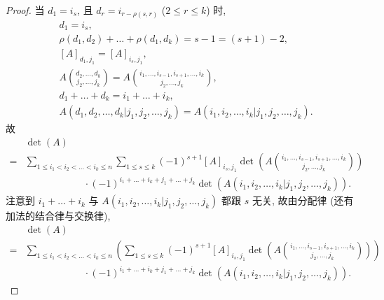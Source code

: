 \begin{proof}
    当 \(d_1 = i_s\),
    且 \(d_r = i_{r - \rho(s, r)}\)
    (\(2 \leq r \leq k\)) 时,
    \begin{align*}
         &
        d_1 = i_s,
        \\
         &
        \rho(d_1, d_2) + \dots + \rho(d_1, d_k)
        = s - 1 = (s + 1) - 2,
        \\
         &
        [A]_{d_1,j_1} = [A]_{i_s,j_1},
        \\
         &
        A\binom{d_2, \dots, d_k}{j_2, \dots, j_k}
        =
        A\binom{i_1, \dots, i_{s-1}, i_{s+1}, \dots, i_k}
        {j_2, \dots, j_k},
        \\
         &
        d_1 + \dots + d_k = i_1 + \dots + i_k,
        \\
         &
        A({d_1,d_2,\dots,d_k}|{j_1,j_2,\dots,j_k})
        =
        A({i_1,i_2,\dots,i_k}|{j_1,j_2,\dots,j_k}).
    \end{align*}
    故
    \begin{align*}
             &
        \det {(A)}
        \\
        = {} &
        \sum_{1 \leq i_1 < i_2 < \dots < i_k \leq n}
        {\sum_{1 \leq s \leq k}
            {(-1)^{s+1} [A]_{i_s,j_1}
                \det {\left(
                    A\binom{i_1, \dots, i_{s-1},
                        i_{s+1}, \dots, i_k}
                    {j_2, \dots, j_k}
                    \right)}}}
        \\
             &
        \qquad \qquad \qquad
        \cdot
        (-1)^{i_1 + \dots + i_k + j_1 + \dots + j_k}
        \det {(A({i_1,i_2,\dots,i_k}|{j_1,j_2,\dots,j_k}))}.
    \end{align*}
    注意到 \(i_1 + \dots + i_k\) 与
    \(A({i_1,i_2,\dots,i_k}|{j_1,j_2,\dots,j_k})\)
    都跟 \(s\) 无关,
    故由分配律 (还有加法的结合律与交换律),
    \begin{align*}
             &
        \det {(A)}
        \\
        = {} &
        \sum_{1 \leq i_1 < i_2 < \dots < i_k \leq n}
        {\left(
            \sum_{1 \leq s \leq k}
            {(-1)^{s+1} [A]_{i_s,j_1}
                \det {\left(
                    A\binom{i_1, \dots, i_{s-1},
                        i_{s+1}, \dots, i_k}
                    {j_2, \dots, j_k}
                    \right)}}
            \right)}
        \\
             &
        \qquad \qquad \qquad
        \cdot
        (-1)^{i_1 + \dots + i_k + j_1 + \dots + j_k}
        \det {(A({i_1,i_2,\dots,i_k}|{j_1,j_2,\dots,j_k}))}.

\end{align*}
\end{proof}

